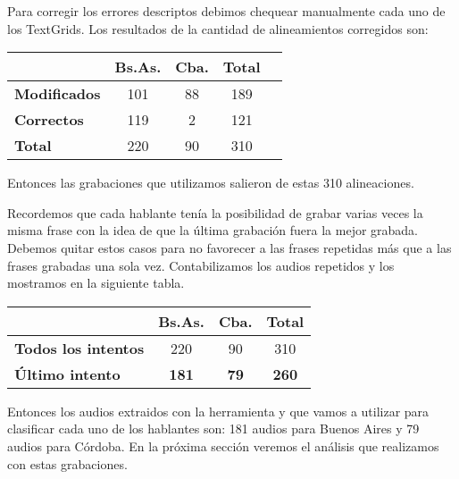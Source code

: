 Para corregir los errores descriptos debimos chequear manualmente cada uno de los TextGrids. Los resultados de la cantidad de alineamientos corregidos son:

\begin{table}[h]
\centering
\begin{tabular}{|l|c|c|c|c|}
\hline
\textbf{}  & \textbf{Bs.As. } & \textbf{Cba.} & \textbf{Total} \\ \hline
\textbf{Modificados}  & 101 & 88 & 189 \\ \hline
\textbf{Correctos}  & 119 & 2 & 121 \\ \hline
\textbf{Total} & 220 & 90 & 310 \\ \hline
\end{tabular}
\end{table}

Entonces las grabaciones que utilizamos salieron de estas 310 alineaciones. 

Recordemos que cada hablante tenía la posibilidad de grabar varias veces la misma frase con la idea de que la última grabación fuera la mejor grabada. Debemos quitar estos casos para no favorecer a las frases repetidas más que a las frases grabadas una sola vez. Contabilizamos los audios repetidos y los mostramos en la siguiente tabla.

\begin{table}[H]
\centering
\begin{tabular}{|l|c|c|c|}
\hline
\textbf{}  & \textbf{Bs.As. } & \textbf{Cba.} & \textbf{Total} \\ \hline
\textbf{Todos los intentos}  & 220 & 90 & 310 \\ \hline
\textbf{Último intento}  & \textbf{181} & \textbf{79} & \textbf{260} \\ \hline
\end{tabular}
\end{table}

Entonces los audios extraidos con la herramienta y que vamos a utilizar para clasificar cada uno de los hablantes son: 181 audios para Buenos Aires y 79 audios para Córdoba.
En la próxima sección veremos el análisis que realizamos con estas grabaciones. 